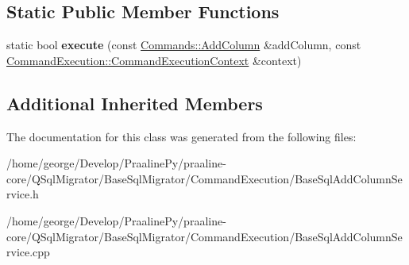 \subsection*{Static Public Member Functions}
\begin{DoxyCompactItemize}
\item 
\mbox{\label{class_q_sql_migrator_1_1_command_execution_1_1_base_sql_add_column_service_ab703a3c3cd97fb936c7c395f117163d8}} 
static bool {\bfseries execute} (const \hyperlink{class_q_sql_migrator_1_1_commands_1_1_add_column}{Commands\+::\+Add\+Column} \&add\+Column, const \hyperlink{class_q_sql_migrator_1_1_command_execution_1_1_command_execution_context}{Command\+Execution\+::\+Command\+Execution\+Context} \&context)
\end{DoxyCompactItemize}
\subsection*{Additional Inherited Members}


The documentation for this class was generated from the following files\+:\begin{DoxyCompactItemize}
\item 
/home/george/\+Develop/\+Praaline\+Py/praaline-\/core/\+Q\+Sql\+Migrator/\+Base\+Sql\+Migrator/\+Command\+Execution/Base\+Sql\+Add\+Column\+Service.\+h\item 
/home/george/\+Develop/\+Praaline\+Py/praaline-\/core/\+Q\+Sql\+Migrator/\+Base\+Sql\+Migrator/\+Command\+Execution/Base\+Sql\+Add\+Column\+Service.\+cpp\end{DoxyCompactItemize}
